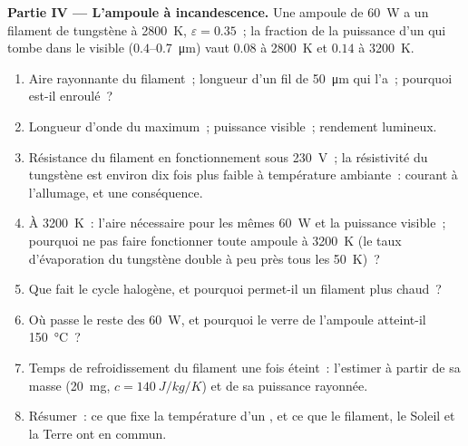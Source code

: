\begin{problem}
\textbf{Partie IV --- L'ampoule à incandescence.}
Une ampoule de \qty{60}{W} a un filament de tungstène à \qty{2800}{K},
$\varepsilon = 0.35$~; la fraction de la puissance d'un  qui tombe dans
le visible ($0.4$--\qty{0.7}{\micro m}) vaut $0.08$ à \qty{2800}{K} et $0.14$
à \qty{3200}{K}.
\begin{enumerate}[resume]
  \item Aire rayonnante du filament~; longueur d'un fil de \qty{50}{\micro m}
        qui l'a~; pourquoi est-il enroulé~?
  \item Longueur d'onde du maximum~; puissance visible~; rendement lumineux.
  \item Résistance du filament en fonctionnement sous \qty{230}{V}~;
        la résistivité du tungstène est environ dix fois plus faible à température
        ambiante~: courant à l'allumage, et une conséquence.
  \item À \qty{3200}{K}~: l'aire nécessaire pour les mêmes \qty{60}{W} et
        la puissance visible~; pourquoi ne pas faire fonctionner toute ampoule à \qty{3200}{K}
        (le taux d'évaporation du tungstène double à peu près tous les
        \qty{50}{K})~?
  \item Que fait le cycle halogène, et pourquoi permet-il un filament plus
        chaud~?
  \item Où passe le reste des \qty{60}{W}, et pourquoi le verre de
        l'ampoule atteint-il \qty{150}{\celsius}~?
  \item Temps de refroidissement du filament une fois éteint~: l'estimer à partir de
        sa masse (\qty{20}{mg}, $c = \qty{140}{J/kg/K}$) et de sa puissance
        rayonnée.
  \item Résumer~: ce que fixe la température d'un , et ce que
        le filament, le Soleil et la Terre ont en commun.
\end{enumerate}
\end{problem}

